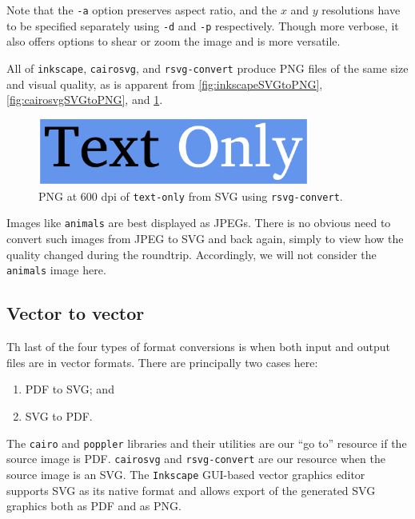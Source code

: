 \documentclass[
  11pt,
  british,
  a4paper,
]{article}
\providecommand{\tightlist}{%
  \setlength{\itemsep}{0pt}\setlength{\parskip}{0pt}}
\begin{document}
Note that the \texttt{-a} option preserves aspect ratio, and the \(x\)
and \(y\) resolutions have to be specified separately using \texttt{-d}
and \texttt{-p} respectively. Though more verbose, it also offers
options to shear or zoom the image and is more versatile.

All of \texttt{inkscape}, \texttt{cairosvg}, and \texttt{rsvg-convert}
produce PNG files of the same size and visual quality, as is apparent
from \cref{fig:inkscapeSVGtoPNG}, \cref{fig:cairosvgSVGtoPNG}, and
\cref{fig:rsvg-convertSVGtoPNG}.

\begin{figure}
\hypertarget{fig:rsvg-convertSVGtoPNG}{%
\centering
\includegraphics[width=0.8\textwidth,height=\textheight]{images/text-only-600-dpi-rsvg-convert.png}
\caption{PNG at 600 dpi of \texttt{text-only} from SVG using
\texttt{rsvg-convert}.}\label{fig:rsvg-convertSVGtoPNG}
}
\end{figure}

Images like \texttt{animals} are best displayed as JPEGs. There is no
obvious need to convert such images from JPEG to SVG and back again,
simply to view how the quality changed during the roundtrip.
Accordingly, we will not consider the \texttt{animals} image here.

\hypertarget{vector-to-vector}{%
\subsection{Vector to vector}\label{vector-to-vector}}

Th last of the four types of format conversions is when both input and
output files are in vector formats. There are principally two cases
here:

\begin{enumerate}
\def\labelenumi{\alph{enumi}.}
\tightlist
\item
  PDF to SVG; and
\item
  SVG to PDF.
\end{enumerate}

The \texttt{cairo} and \texttt{poppler} libraries and their utilities
are our ``go to'' resource if the source image is PDF. \texttt{cairosvg}
and \texttt{rsvg-convert} are our resource when the source image is an
SVG. The \texttt{Inkscape} GUI-based vector graphics editor supports SVG
as its native format and allows export of the generated SVG graphics
both as PDF and as PNG.
\end{document}
